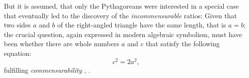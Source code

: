 \documentclass[11pt]{amsart}
\theoremstyle{definition}
\begin{document}
But it is assumed, that only the Pythagoreans were interested in a special case that eventually led to the discovery of the \emph{incommensurable} ratios: Given that two sides \(a\) and \(b\) of the right-angled triangle have the same length, that is \(a = b\); the crucial question, again expressed in modern algebraic symbolism, must have been whether there are whole numbers \(a\) and \(c\) that satisfy the following equation:
\begin{equation}
    c^{2} = 2a^{2},
\end{equation}
fulfilling \emph{commensurability} \cite[6-7]{stillwellStoryProofLogic2022}, \cite[58]{courantWhatMathematicsElementary1996}.


\end{document}
